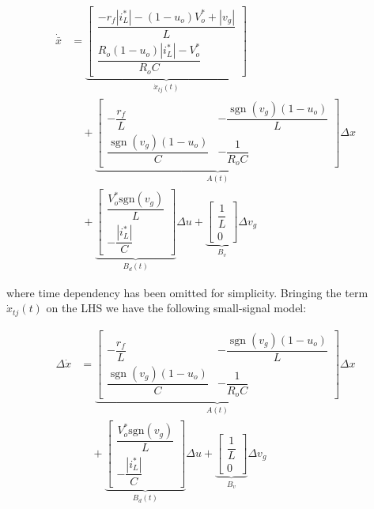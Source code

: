 \documentclass[DIV=calc, paper=a4, fontsize=11pt, twocolumn]{scrartcl}	 %
\begin{document}
{\small
\begin{equation}
\begin{split}
\dot{\bar{x}} &=
\underbrace{
\begin{bmatrix} 
\dfrac{-r_f |i^*_L| - ( 1- u_o) V^*_{o} + |v_g|}{L}\\[12pt] 
\dfrac{R_o ( 1- u_o)|i^*_L| - V^*_{o}}{R_oC}
\end{bmatrix}}_{\dot{x}_{tj}(t)} \\
&\quad +
\underbrace{
\begin{bmatrix} 
-\dfrac{r_f}{L} & -\dfrac{\operatorname{sgn}(v_g) ( 1- u_o)}{L} \\[12pt] 
\dfrac{\operatorname{sgn}(v_g) ( 1- u_o)}{C} & -\dfrac{1}{R_o C} 
\end{bmatrix}}_{A(t)} \Delta{x} \\
&\quad + 
\underbrace{
\begin{bmatrix} 
\dfrac{V^*_{o} \text{sgn}(v_g)}{L} \\[12pt] 
-\dfrac{|i^*_{L}|}{C} 
\end{bmatrix}}_{B_d(t)} \Delta{u} + 
\underbrace{
\begin{bmatrix} 
\dfrac{1}{L} \\[8pt] 
0 
\end{bmatrix}}_{B_v} \Delta{v}_g
\end{split}
\end{equation}
}

where time dependency has been omitted for simplicity.
Bringing the term $\dot{x}_{tj}(t)$ on the LHS we have the following small-signal model:

{\small
\begin{equation}
\begin{split}
\Delta{\dot{x}} &=
\underbrace{
\begin{bmatrix} 
-\dfrac{r_f}{L} & -\dfrac{\operatorname{sgn}(v_g) ( 1- u_o)}{L} \\[12pt] 
\dfrac{\operatorname{sgn}(v_g) ( 1- u_o)}{C} & -\dfrac{1}{R_o C} 
\end{bmatrix}}_{A(t)} \Delta{x} \\
&\quad + 
\underbrace{
\begin{bmatrix} 
\dfrac{V^*_{o} \text{sgn}(v_g)}{L} \\[12pt] 
-\dfrac{|i^*_{L}|}{C} 
\end{bmatrix}}_{B_d(t)} \Delta{u} + 
\underbrace{
\begin{bmatrix} 
\dfrac{1}{L} \\[8pt] 
0 
\end{bmatrix}}_{B_v} \Delta{v}_g
\end{split}
\end{equation}
}
\end{document}
